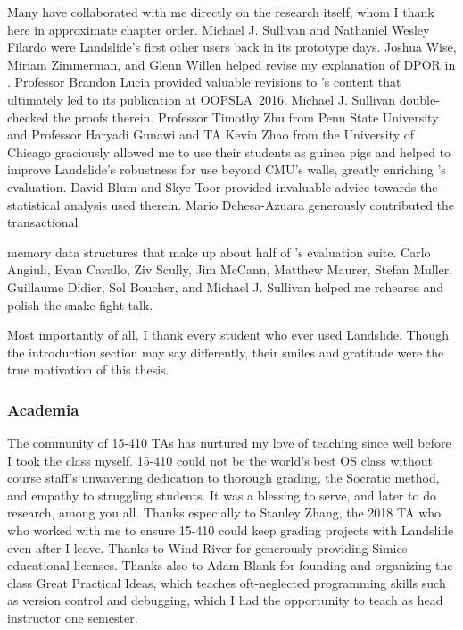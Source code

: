\documentclass[12pt]{cmuthesis}
\begin{document}
\begin{acknowledgments}
{{Many have collaborated with me directly on the research itself,
whom I thank here in approximate chapter order.
Michael J. Sullivan and Nathaniel Wesley Filardo were Landslide's first other users
back in its prototype days.
Joshua Wise, Miriam Zimmerman, and Glenn Willen helped revise my explanation of DPOR in .
Professor Brandon Lucia provided valuable revisions to 's content
	that ultimately led to its publication at \mbox{OOPSLA}~2016.
Michael J. Sullivan double-checked the proofs therein.
Professor Timothy Zhu from Penn State University
and Professor Haryadi Gunawi and TA Kevin Zhao from the University of Chicago
graciously allowed me to use their students as guinea pigs
and helped to improve Landslide's
robustness for use beyond CMU's walls,
greatly enriching 's evaluation.
David Blum and Skye Toor provided
invaluable advice towards the statistical analysis
used therein.
Mario Dehesa-Azuara generously contributed the transactional
\unskip\parfillskip 0pt \par}

\pagebreak

\noindent
memory data structures
that make up about half of 's evaluation suite.
%
Carlo Angiuli, Evan Cavallo, Ziv Scully, Jim McCann,
Matthew Maurer, Stefan Muller, Guillaume Didier,
Sol Boucher, and Michael J. Sullivan
helped me rehearse and polish the snake-fight talk.

Most importantly of all, I thank every student who ever used Landslide.
Though the introduction section may say differently,
their smiles and gratitude were the true motivation of this thesis.

\subsubsection{Academia}

The community of 15-410 TAs
has nurtured my love of teaching
since well before I took the class myself.
15-410 could not be the world's best OS class
without %
course staff's %
unwavering dedication to
thorough grading, the Socratic method,
and empathy to struggling students.
It was a blessing to serve, and later to do research, among you all.
Thanks especially to Stanley Zhang,
the 2018 TA who who worked with me to ensure
15-410 could keep grading projects with Landslide even after I leave.
Thanks to Wind River for generously
providing
Simics educational licenses.
Thanks also to Adam Blank %
for founding and organizing the class Great Practical Ideas,
which teaches oft-neglected programming skills such as version control and debugging,
which I had the opportunity to teach as head instructor one semester.

}
\end{acknowledgments}
\end{document}
